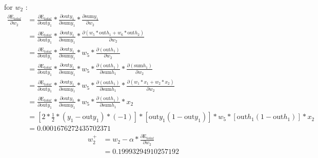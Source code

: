 \documentclass[a4paper, article, oneside, USenglish, IN5460]{memoir}
\begin{document}
{\newline
for $w_2$ :
\begin{equation}
\begin{aligned}
\frac{\partial \text{E}_{total}  }{\partial w_2} &= \frac{\partial \text{E}_{total}}{\partial \text{out}y_1} *\frac{\partial  \text{out}y_1}{\partial \text{sum}y_1}*\frac{\partial \text{sum}y_1}{\partial  w_2} \\
&= \frac{\partial \text{E}_{total}}{\partial \text{out}y_1} *\frac{\partial  \text{out}y_1}{\partial \text{sum}y_1}*\frac{\partial ( w_5*\text{out}h_1 + w_6*\text{out}h_2 )} {\partial w_2} \\
&= \frac{\partial \text{E}_{total}}{\partial \text{out}y_1} * \frac{\partial \text{out}y_1}{\partial \text{sum}y_1} *{w_5}* \frac{\partial ( \text{out}h_1 )} {\partial w_2}\\
&= \frac{\partial \text{E}_{total}}{\partial \text{out}y_1} * \frac{\partial \text{out}y_1}{\partial \text{sum}y_1} *{w_5}* \frac{\partial ( \text{out}h_1 )}{\partial \text{sum}h_1} * \frac{\partial ( \text{sum}h_1)}{\partial w_2}\\
&= \frac{\partial \text{E}_{total}}{\partial \text{out}y_1} * \frac{\partial \text{out}y_1}{\partial \text{sum}y_1} *{w_5}* \frac{\partial ( \text{out}h_1 )}{\partial \text{sum}h_1} * \frac{\partial ( w_1*x_1 + w_2*x_2)}{\partial w_2}\\
&= \frac{\partial \text{E}_{total}}{\partial \text{out}y_1} * \frac{\partial \text{out}y_1}{\partial \text{sum}y_1} *{w_5}* \frac{\partial ( \text{out}h_1 )}{\partial \text{sum}h_1} *  {x_2}\\
&= [2*\frac{1}{2}*(y_1 -\text{out}y_1)*(-1)] * [\text{out}y_1(1-\text{out}y_1)] *{w_5}* [\text{out}h_1 (1-\text{out}h_1)]*  {x_2}\\
& =  0.0001676272435702371
\end{aligned}
\end{equation}
\begin{equation}
\begin{aligned}
w^+_2 &= w_2 - \alpha * \frac{\partial \text{E}_{total}  }{\partial w_2} \\
& = 0.19993294910257192
\end{aligned}
\end{equation}


}
\end{document}
